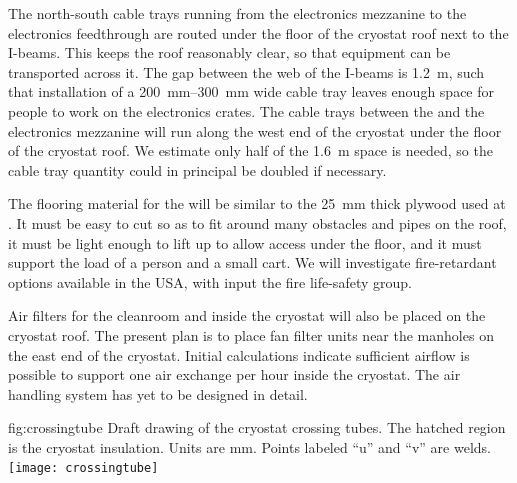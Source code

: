 The north-south cable trays  running from the electronics mezzanine to the electronics feedthrough are routed under the floor of the cryostat roof next to the %
I-beams. This keeps the roof reasonably clear, so that equipment can be transported across it. %
The gap between the web of the I-beams is \SI{1.2}{m}, such that %
installation of a \SIrange{200}{300}{mm} wide cable tray %
leaves enough space %
for people to work on the electronics crates. 
The cable trays between the  and the electronics mezzanine will run along the west end of the cryostat under the floor of the cryostat roof. 
We estimate only half of the \SI{1.6}{m} space is needed, so the cable tray quantity could in principal be doubled if necessary. 

The flooring material for the  %
will be similar to the \SI{25}{mm} thick plywood used at . %
It must be easy to cut so as to fit around many obstacles and pipes on the roof, it must be light enough to lift up to allow access under the floor, and it must support the load of a person %
and a small cart. 
We will investigate %
fire-retardant options available %
in the USA, %
with input the  fire life-safety group. 

Air filters for the cleanroom and inside the cryostat will also be placed on the cryostat roof. The present plan is to place fan filter units near the manholes on the east end of the cryostat. Initial calculations indicate sufficient airflow is possible to support one air exchange per hour inside the cryostat. The air handling system has yet to be designed in detail.


\begin{dunefigure}{fig:crossingtube}
  {Draft drawing of the cryostat crossing tubes. The hatched region is the cryostat insulation. Units are mm. Points labeled ``u'' and ``v'' are welds. }
\texttt{[image: crossingtube]}
\end{dunefigure}
 
